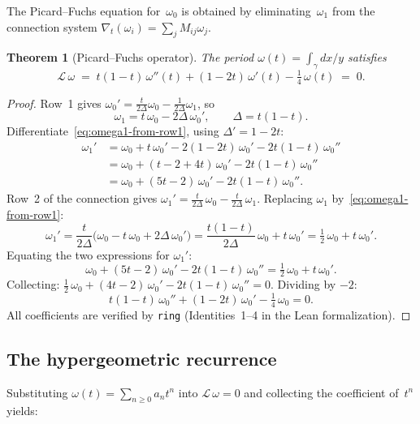 \documentclass[11pt]{article}
\theoremstyle{plain}
\newtheorem{theorem}{Theorem}[section]
\theoremstyle{definition}
\theoremstyle{remark}
\newcommand{\calL}{\mathcal{L}}
\begin{document}
The Picard--Fuchs equation for~$\omega_0$ is obtained by eliminating~$\omega_1$
from the connection system $\nabla_t(\omega_i) = \sum_j M_{ij}\omega_j$.

\begin{theorem}[Picard--Fuchs operator]\label{thm:pf}
The period $\omega(t) = \int_\gamma dx/y$ satisfies
\[
  \calL\,\omega \;=\; t(1-t)\,\omega''(t) + (1-2t)\,\omega'(t)
  - \tfrac{1}{4}\,\omega(t) \;=\; 0.
\]
\end{theorem}
\begin{proof}
Row~1 gives $\omega_0' = \frac{t}{2\Delta}\omega_0 - \frac{1}{2\Delta}\omega_1$,
so
\begin{equation}\label{eq:omega1-from-row1}
  \omega_1 = t\,\omega_0 - 2\Delta\,\omega_0',
  \qquad \Delta = t(1-t).
\end{equation}
Differentiate~\eqref{eq:omega1-from-row1}, using $\Delta' = 1-2t$:
\begin{align*}
  \omega_1'
    &= \omega_0 + t\,\omega_0'
       - 2(1-2t)\,\omega_0' - 2t(1-t)\,\omega_0'' \\
    &= \omega_0 + (t - 2 + 4t)\,\omega_0'
       - 2t(1-t)\,\omega_0'' \\
    &= \omega_0 + (5t-2)\,\omega_0'
       - 2t(1-t)\,\omega_0''.
\end{align*}
Row~2 of the connection gives
$\omega_1' = \frac{t}{2\Delta}\,\omega_0 - \frac{t}{2\Delta}\,\omega_1$.
Replacing $\omega_1$ by~\eqref{eq:omega1-from-row1}:
\[
  \omega_1'
  = \frac{t}{2\Delta}\bigl(\omega_0 - t\,\omega_0 + 2\Delta\,\omega_0'\bigr)
  = \frac{t(1-t)}{2\Delta}\,\omega_0 + t\,\omega_0'
  = \tfrac{1}{2}\,\omega_0 + t\,\omega_0'.
\]
Equating the two expressions for $\omega_1'$:
\[
  \omega_0 + (5t-2)\,\omega_0' - 2t(1-t)\,\omega_0''
  = \tfrac{1}{2}\,\omega_0 + t\,\omega_0'.
\]
Collecting: $\tfrac{1}{2}\,\omega_0 + (4t-2)\,\omega_0' - 2t(1-t)\,\omega_0'' = 0$.
Dividing by $-2$:
\[
  t(1-t)\,\omega_0'' + (1-2t)\,\omega_0' - \tfrac{1}{4}\,\omega_0 = 0.
\]
All coefficients are verified by \texttt{ring}
(Identities~1--4 in the Lean formalization).
\end{proof}

\subsection{The hypergeometric recurrence}

Substituting $\omega(t) = \sum_{n \geq 0} a_n t^n$ into
$\calL\,\omega = 0$ and collecting the coefficient of~$t^n$ yields:
\end{document}
